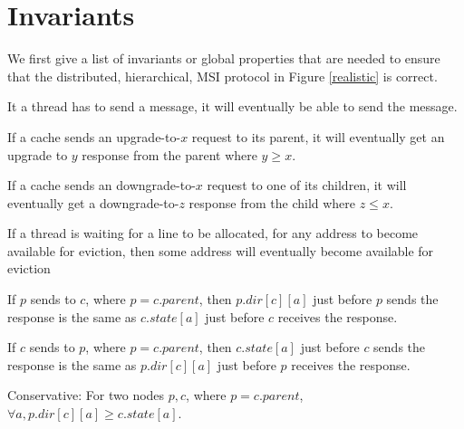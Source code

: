 \section{Invariants}
\label{sec:properties}

We first give a list of invariants or global properties that are needed to
ensure that the distributed, hierarchical, MSI protocol in Figure
\ref{realistic} is correct.

\begin{theorem}
It a thread has to send a message, it will eventually be able to send the
message.
\label{canSend}
\end{theorem}

\begin{theorem}
If a cache sends an upgrade-to-$x$ request to its parent, it will eventually
get an upgrade to $y$ response from the parent where $y \ge x$.
\label{willRecv}
\end{theorem}

\begin{theorem}
If a cache sends an downgrade-to-$x$ request to one of its children, it will
eventually get a downgrade-to-$z$ response from the child where $z \le x$.
\label{willRecv2}
\end{theorem}

\begin{theorem}
If a thread is waiting for a line to be allocated, \ie for any address to become
available for eviction, then some address will eventually become available for
eviction
\label{evictDead}
\end{theorem}

\begin{theorem}
If $p$ sends  to $c$, where $p = c.parent$, then $p.dir[c][a]$
just before $p$ sends the response is the same as $c.state[a]$ just before $c$
receives the response.
\label{pcSame}
\end{theorem}

\begin{theorem}
If $c$ sends  to $p$, where $p = c.parent$, then $c.state[a]$
just before $c$ sends the response is the same as $p.dir[c][a]$ just before $p$
receives the response.
\label{cpSame}
\end{theorem}

\begin{theorem}
Conservative: For two nodes $p, c$, where $p = c.parent$, $\forall a,
p.dir[c][a] \ge c.state[a]$.
\label{conservative}
\end{theorem}


